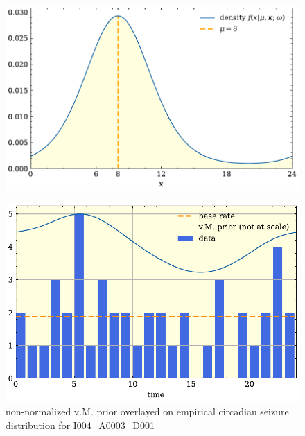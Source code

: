 \begin{figure}[htbp]
    \centering
    \includegraphics[width=\floatwidth]{02Background/Figs/VM/vm_density.pdf}
    \label{fig:bsle:vm_density}
\end{figure}

\begin{figure}[htbp]
    \centering
    \includegraphics{5Results/figs/prior/vm_prior.pdf}
    \caption{non-normalized v.M. prior overlayed on empirical circadian seizure distribution for I004\_A0003\_D001}
    \label{fig:vm_prior}
\end{figure}
